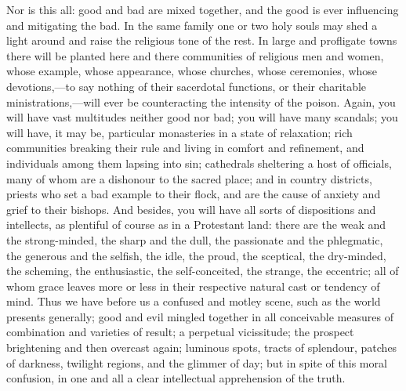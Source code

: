 Nor is this all: good and bad are mixed together, and the good is
ever influencing and mitigating the bad. In the same family one or two
holy souls may shed a light around and raise the religious tone of the
rest. In large and profligate towns there will be planted here and
there communities of religious men and women, whose example, whose
appearance, whose churches, whose ceremonies, whose devotions,—to say
nothing of their sacerdotal functions, or their charitable
ministrations,—will ever be counteracting the intensity of the
poison. Again, you will have vast multitudes neither good nor bad; you
will have many scandals; you will have, it may be, particular
monasteries in a state of relaxation; rich communities breaking their
rule and living in comfort and refinement, and individuals among them
lapsing into sin; cathedrals sheltering a host of officials, many of
whom are a dishonour to the sacred place; and in country districts,
priests who set a bad example to their flock, and are the cause of
anxiety and grief to their bishops. And besides, you will have all
sorts of dispositions and intellects, as plentiful of course as in a
Protestant land: there are the weak and the strong-minded, the sharp
and the dull, the passionate and the phlegmatic, the generous and the
selfish, the idle, the proud, the sceptical, the dry-minded, the
scheming, the enthusiastic, the self-conceited, the strange, the
eccentric; all of whom grace leaves more or less in their respective
natural cast or tendency of mind. Thus we have before us a confused
and motley scene, such as the world presents generally; good and evil
mingled together in all conceivable measures of combination and
varieties of result; a perpetual vicissitude; the prospect brightening
and then overcast again; luminous spots, tracts of splendour, patches
of darkness, twilight regions, and the glimmer of day; but in spite of
this moral confusion, in one and all a clear intellectual apprehension
of the truth.

